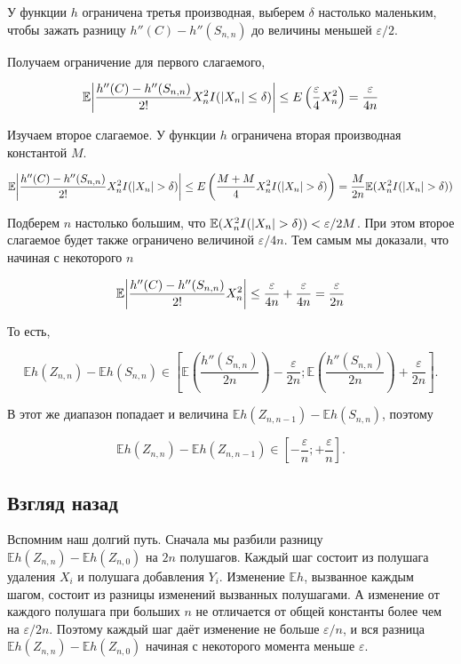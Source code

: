 \documentclass[
  letterpaper,
  DIV=11,
  numbers=noendperiod]{scrartcl}
\newcommand\E{{\mathbb{E}}}
\begin{document}
У функции \(h\) ограничена третья производная, выберем \(\delta\)
настолько маленьким, чтобы зажать разницу \(h''(C) - h''(S_{n,n})\) до
величины меньшей \(\varepsilon/2\).

Получаем ограничение для первого слагаемого,

\[
\E\abs{\frac{h''(C) - h''(S_{n,n})}{2!}X_n^2I(\abs{X_n} \leq \delta)} \leq E\left(\frac{\varepsilon}{4}X_n^2\right)=\frac{\varepsilon}{4n}
\]

Изучаем второе слагаемое. У функции \(h\) ограничена вторая производная
константой \(M\).

\[
\E\abs{\frac{h''(C) - h''(S_{n,n})}{2!}X_n^2I(\abs{X_n} > \delta)} \leq E\left(\frac{M + M}{4}X_n^2I(\abs{X_n} > \delta)\right)=\frac{M}{2n}\E(X_n^2I(\abs{X_n} > \delta))
\]

Подберем \(n\) настолько большим, что
\(\E(X_n^2 I(\abs{X_n} > \delta)) < \varepsilon/2M\). При этом второе
слагаемое будет также ограничено величиной \(\varepsilon/4n\). Тем самым
мы доказали, что начиная с некоторого \(n\)

\[
\E\abs{\frac{h''(C) - h''(S_{n,n})}{2!}X_n^2 } \leq \frac{\varepsilon}{4n} + \frac{\varepsilon}{4n} = \frac{\varepsilon}{2n}
\]

То есть,

\[
\E h(Z_{n,n}) - \E h(S_{n,n}) \in \left[ \E\left(\frac{h''(S_{n,n})}{2n}\right) - \frac{\varepsilon}{2n}; \E\left(\frac{h''(S_{n,n})}{2n}\right) + \frac{\varepsilon}{2n} \right].
\]

В этот же диапазон попадает и величина
\(\E h(Z_{n,n-1}) - \E h(S_{n,n})\), поэтому

\[
\E h(Z_{n,n}) - \E h(Z_{n,n-1}) \in \left[ - \frac{\varepsilon}{n}; + \frac{\varepsilon}{n} \right].
\]

\hypertarget{ux432ux437ux433ux43bux44fux434-ux43dux430ux437ux430ux434}{%
\subsection{Взгляд
назад}\label{ux432ux437ux433ux43bux44fux434-ux43dux430ux437ux430ux434}}

Вспомним наш долгий путь. Сначала мы разбили разницу
\(\E h(Z_{n,n}) - \E h(Z_{n,0})\) на \(2n\) полушагов. Каждый шаг
состоит из полушага удаления \(X_i\) и полушага добавления \(Y_i\).
Изменение \(\E h\), вызванное каждым шагом, состоит из разницы изменений
вызванных полушагами. А изменение от каждого полушага при больших \(n\)
не отличается от общей константы более чем на \(\varepsilon/2n\).
Поэтому каждый шаг даёт изменение не больше \(\varepsilon/n\), и вся
разница \(\E h(Z_{n,n}) - \E h(Z_{n,0})\) начиная с некоторого момента
меньше \(\varepsilon\).
\end{document}
